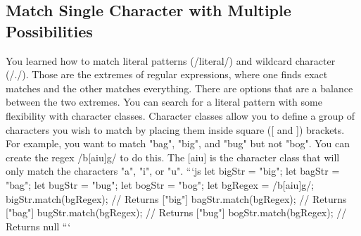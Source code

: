 \documentclass{article}%
\begin{document}
\subsection{Match Single Character with Multiple Possibilities}%
\label{subsec:MatchSingleCharacterwithMultiplePossibilities}%
You learned how to match literal patterns (/literal/) and wildcard character (/./). Those are the extremes of regular expressions, where one finds exact matches and the other matches everything. There are options that are a balance between the two extremes.\newline%
You can search for a literal pattern with some flexibility with character classes. Character classes allow you to define a group of characters you wish to match by placing them inside square ({[} and {]}) brackets.\newline%
For example, you want to match "bag", "big", and "bug" but not "bog". You can create the regex /b{[}aiu{]}g/ to do this. The {[}aiu{]} is the character class that will only match the characters "a", "i", or "u".\newline%
```js\newline%
let bigStr = "big";\newline%
let bagStr = "bag";\newline%
let bugStr = "bug";\newline%
let bogStr = "bog";\newline%
let bgRegex = /b{[}aiu{]}g/;\newline%
bigStr.match(bgRegex); // Returns {[}"big"{]}\newline%
bagStr.match(bgRegex); // Returns {[}"bag"{]}\newline%
bugStr.match(bgRegex); // Returns {[}"bug"{]}\newline%
bogStr.match(bgRegex); // Returns null\newline%
```\newline%

%
\end{document}
